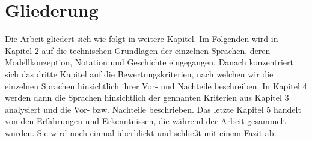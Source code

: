 \section{Gliederung}
Die Arbeit gliedert sich wie folgt in weitere Kapitel. Im Folgenden wird in Kapitel 2 auf die technischen Grundlagen der einzelnen Sprachen, deren Modellkonzeption, Notation und Geschichte eingegangen. Danach konzentriert sich das dritte Kapitel auf die Bewertungskriterien, nach welchen wir die einzelnen Sprachen hinsichtlich ihrer Vor- und Nachteile beschreiben. In Kapitel 4 werden dann die Sprachen hinsichtlich der gennanten Kriterien aus Kapitel 3 analysiert und die Vor- bzw. Nachteile beschrieben.
Das letzte Kapitel 5 handelt von den Erfahrungen und Erkenntnissen, die während
der Arbeit gesammelt wurden. Sie wird noch einmal überblickt und schließt mit einem Fazit ab.
